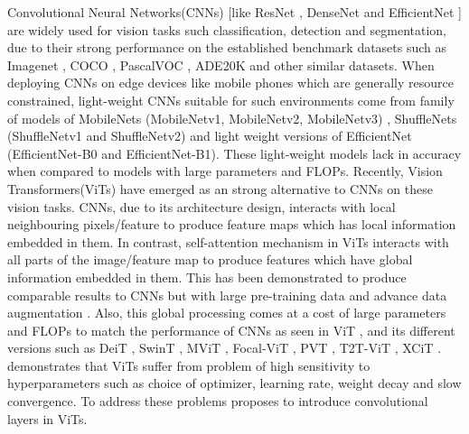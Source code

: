 \documentclass{article} \usepackage{iclr2022_conference,times}
\begin{document}
Convolutional Neural Networks(CNNs) [like ResNet \citep{he2016deep}, DenseNet \citep{huang2017densely} and EfficientNet \citep{tan2019efficientnet}] are widely used for vision tasks such classification, detection and segmentation, due to their strong performance on the established benchmark datasets such as Imagenet \citep{russakovsky2015imagenet}, COCO \citep{lin2014microsoft}, PascalVOC \citep{Everingham15}, ADE20K \citep{zhou2017scene} and other similar datasets. 
When deploying CNNs on edge devices like mobile phones which are generally resource constrained, light-weight CNNs suitable for such environments come from family of models of MobileNets  (MobileNetv1, MobileNetv2, MobileNetv3) \citep{howard2019searching}, ShuffleNets (ShuffleNetv1 and ShuffleNetv2) \citep{ma2018shufflenet} and light weight versions of EfficientNet \citep{tan2019efficientnet} (EfficientNet-B0 and EfficientNet-B1). 
These light-weight models lack in accuracy when compared to models with large parameters and FLOPs. 
Recently, Vision Transformers(ViTs) have emerged as an strong alternative to CNNs on these vision tasks. 
CNNs, due to its architecture design, interacts with local neighbouring pixels/feature to produce feature maps which has local information embedded in them.
In contrast, self-attention mechanism in ViTs interacts with all parts of the image/feature map to produce features which have global information embedded in them. 
This has been demonstrated to produce comparable results to CNNs but with large pre-training data and advance data augmentation \citep{dosovitskiy2020image}.   
Also, this global processing comes at a cost of large parameters and FLOPs to match the performance of CNNs as seen in ViT \citep{dosovitskiy2020image}, and its different versions such as DeiT \citep{touvron2021training}, SwinT \citep{liu2021swin}, MViT \citep{fan2021multiscale}, Focal-ViT \citep{yang2021focal}, PVT \citep{wang2021pyramid}, T2T-ViT \citep{yuan2021tokens}, XCiT \citep{ali2021xcit}. 
\citep{xiao2021early} demonstrates that ViTs suffer from problem of high sensitivity to hyperparameters such as choice of optimizer, learning rate, weight decay and slow convergence.
To address these problems \citep{xiao2021early} proposes to introduce convolutional layers in ViTs. 
\end{document}
